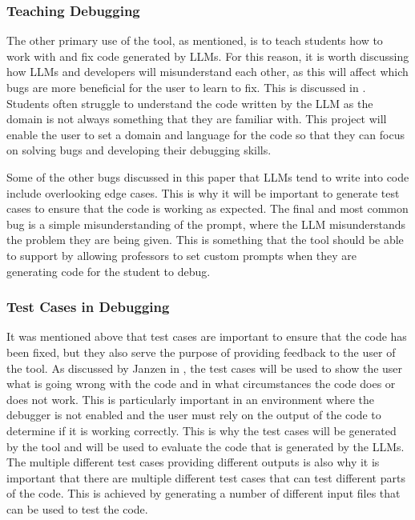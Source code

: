 \documentclass[12pt]{extarticle}
\begin{document}
\subsubsection{Teaching Debugging}

The other primary use of the tool, as mentioned, is to teach students how to work with and fix code generated by LLMs. For this reason, it is worth discussing how LLMs and developers will misunderstand each other, as this will affect which bugs are more beneficial for the user to learn to fix. This is discussed in \cite{nguyen2024}. Students often struggle to understand the code written by the LLM as the domain is not always something that they are familiar with. This project will enable the user to set a domain and language for the code so that they can focus on solving bugs and developing their debugging skills. 

Some of the other bugs discussed in this paper that LLMs tend to write into code include overlooking edge cases. This is why it will be important to generate test cases to ensure that the code is working as expected. The final and most common bug is a simple misunderstanding of the prompt, where the LLM misunderstands the problem they are being given. This is something that the tool should be able to support by allowing professors to set custom prompts when they are generating code for the student to debug.

\subsubsection{Test Cases in Debugging}

It was mentioned above that test cases are important to ensure that the code has been fixed, but they also serve the purpose of providing feedback to the user of the tool. As discussed by Janzen in \cite{Janzen2008}, the test cases will be used to show the user what is going wrong with the code and in what circumstances the code does or does not work. This is particularly important in an environment where the debugger is not enabled and the user must rely on the output of the code to determine if it is working correctly. This is why the test cases will be generated by the tool and will be used to evaluate the code that is generated by the LLMs. The multiple different test cases providing different outputs is also why it is important that there are multiple different test cases that can test different parts of the code. This is achieved by generating a number of different input files that can be used to test the code.
\end{document}
